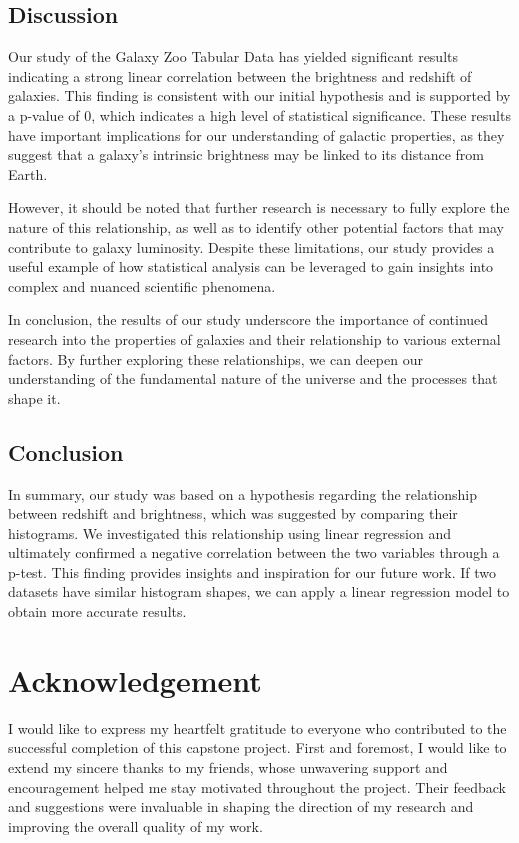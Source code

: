 \documentclass[12pt]{article}
\begin{document}
\newpage
\subsection{Discussion}

Our study of the Galaxy Zoo Tabular Data has yielded significant results indicating a strong linear correlation between the brightness and redshift of galaxies. This finding is consistent with our initial hypothesis and is supported by a p-value of 0, which indicates a high level of statistical significance. These results have important implications for our understanding of galactic properties, as they suggest that a galaxy's intrinsic brightness may be linked to its distance from Earth.

\noindent
However, it should be noted that further research is necessary to fully explore the nature of this relationship, as well as to identify other potential factors that may contribute to galaxy luminosity. Despite these limitations, our study provides a useful example of how statistical analysis can be leveraged to gain insights into complex and nuanced scientific phenomena.

\noindent
In conclusion, the results of our study underscore the importance of continued research into the properties of galaxies and their relationship to various external factors. By further exploring these relationships, we can deepen our understanding of the fundamental nature of the universe and the processes that shape it.

\subsection{Conclusion}
In summary, our study was based on a hypothesis regarding the relationship between redshift and brightness, which was suggested by comparing their histograms. We investigated this relationship using linear regression and ultimately confirmed a negative correlation between the two variables through a p-test. This finding provides insights and inspiration for our future work. If two datasets have similar histogram shapes, we can apply a linear regression model to obtain more accurate results.

\newpage

\section{Acknowledgement}

I would like to express my heartfelt gratitude to everyone who contributed to the successful completion of this capstone project. First and foremost, I would like to extend my sincere thanks to my friends, whose unwavering support and encouragement helped me stay motivated throughout the project. Their feedback and suggestions were invaluable in shaping the direction of my research and improving the overall quality of my work.
\end{document}

